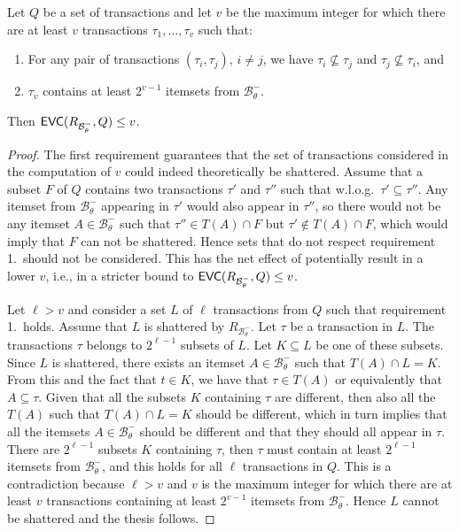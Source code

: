 \begin{lemma}\label{lem:negbordvcdimupbound}
  Let $Q$ be a set of transactions and let $v$ be the maximum integer for which 
  there are at least $v$ transactions $\tau_1,\dotsc,\tau_v$ such that:
  \begin{enumerate}
    \item For any pair of transactions $(\tau_i,\tau_j)$, $i\neq j$, we have
      $\tau_i\not\subseteq\tau_j$ and $\tau_j\not\subseteq\tau_i$, and
    \item $\tau_v$ contains at least $2^{v-1}$ itemsets from
      $\mathcal{B}^-_\theta$.
  \end{enumerate}
  Then $\mathsf{EVC}(R_{\mathcal{B}^-_\theta},Q)\le v$.
\end{lemma}

\begin{proof}
  The first requirement guarantees that the set of transactions considered in
  the computation of $v$ could indeed theoretically be shattered. Assume that a
  subset $F$ of $Q$ contains two transactions $\tau'$ and $\tau''$ such that
  w.l.o.g.~$\tau'\subseteq\tau''$. Any itemset from $\mathcal{B}^-_\theta$
  appearing in $\tau'$ would also appear in $\tau''$, so there would not be any
  itemset $A\in\mathcal{B}^-_\theta$ such that $\tau''\in T(A)\cap F$ but
  $\tau'\not\in T(A)\cap F$, which would imply that $F$ can not be shattered.
  Hence sets that do not respect requirement 1.~should not be considered. This
  has the net effect of potentially result in a lower $v$, i.e., in a stricter
  bound to $\mathsf{EVC}(R_{\mathcal{B}^-_\theta},Q)\le v$.

  Let $\ell>v$ and consider a set $L$ of $\ell$ transactions from $Q$ such that
  requirement 1.~holds. Assume that $L$ is shattered by
  $R_{\mathcal{B}^-_\theta}$. Let $\tau$ be a transaction in $L$.
  The transactions $\tau$ belongs to $2^{\ell-1}$ subsets of $L$. Let
  $K\subseteq L$ be one of these subsets. Since $L$ is shattered, there exists an
  itemset $A\in\mathcal{B}^-_\theta$ such that $T(A)\cap L=K$. From this and the fact
  that $t\in K$, we have that $\tau\in T(A)$ or equivalently that
  $A\subseteq\tau$. Given that all the subsets $K$ containing $\tau$ are
  different, then also all the $T(A)$ such that $T(A)\cap L=K$ should be
  different, which in turn implies that all the itemsets
  $A\in\mathcal{B}^-_\theta$ should be different and that they should all
  appear in $\tau$. There are $2^{\ell-1}$ subsets $K$ containing $\tau$, then
  $\tau$ must contain at least $2^{\ell-1}$ itemsets from $\mathcal{B}^-_\theta$,
  and this holds for all $\ell$ transactions in $Q$. This is a contradiction
  because $\ell>v$ and $v$ is the maximum integer for which there are at least
  $v$ transactions containing at least $2^{v-1}$ itemsets from
  $\mathcal{B}^-_\theta$. Hence $L$ cannot be shattered and the thesis follows.
\end{proof}

